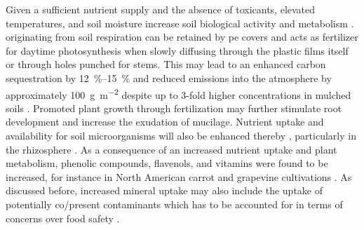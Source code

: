 Given a sufficient nutrient supply and the absence of toxicants, elevated temperatures, and soil moisture increase soil biological activity \citep{SubrahmaniyanCrop2006} and metabolism \citep{LiProductivity2004}.  originating from soil respiration can be retained by \ac{pe} covers and acts as fertilizer for daytime photosynthesis when slowly diffusing through the plastic films itself or through holes punched for stems. This may lead to an enhanced carbon sequestration by \SIrange{12}{15}{\percent} \citep{AnCarbon2015} and reduced  emissions into the atmosphere by approximately \SI{100}{\gram\per\square\meter}  despite up to 3-fold higher  concentrations in mulched soils \citep{LiCarbon2011}. Promoted plant growth through  fertilization may further stimulate root development and increase the exudation of mucilage. Nutrient uptake and availability for soil microorganisms will also be enhanced thereby \citep{LiuResponse2015,SubrahmaniyanCrop2006}, particularly in the rhizosphere \citep{LinEffect2008,MaulMicrobial2014}. As a consequence of an increased nutrient uptake and plant metabolism, phenolic compounds, flavenols, and vitamins were found to be increased, for instance in North American carrot and grapevine cultivations \citep{AntoniousColor2002,CoventryReflective2005}.
As discussed before, increased mineral uptake may also include the uptake of potentially co\-/present contaminants which has to be accounted for in terms of concerns over food safety \citep{MorenoGrowth2003}.


